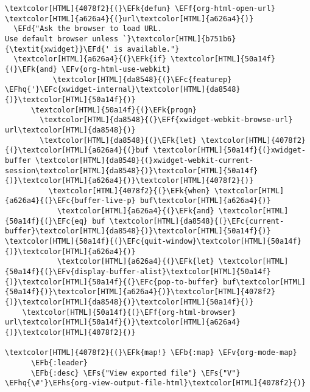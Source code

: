 \documentclass{scrartcl}
\newcommand{\EFk}[1]{\textcolor{EFk}{#1}} %
\newcommand{\EFd}[1]{\textcolor{EFd}{\textit{#1}}} %
\newcommand{\EFs}[1]{\textcolor{EFs}{#1}} %
\newcommand{\EFb}[1]{\textcolor{EFb}{#1}} %
\newcommand{\EFc}[1]{\textcolor{EFc}{#1}} %
\newcommand{\EFv}[1]{\textcolor{EFv}{#1}} %
\newcommand{\EFf}[1]{\textcolor{EFf}{#1}} %
\newcommand{\EFhq}[1]{\textcolor{EFhq}{#1}} %
\newcommand{\EFhs}[1]{\textcolor{EFhs}{#1}} %
\begin{document}
\begin{Code}
\begin{Verbatim}[]
\textcolor[HTML]{4078f2}{(}\EFk{defun} \EFf{org-html-open-url} \textcolor[HTML]{a626a4}{(}url\textcolor[HTML]{a626a4}{)}
  \EFd{"Ask the browser to load URL.
Use default browser unless `}\textcolor[HTML]{b751b6}{\textit{xwidget}}\EFd{' is available."}
  \textcolor[HTML]{a626a4}{(}\EFk{if} \textcolor[HTML]{50a14f}{(}\EFk{and} \EFv{org-html-use-webkit}
           \textcolor[HTML]{da8548}{(}\EFc{featurep} \EFhq{'}\EFc{xwidget-internal}\textcolor[HTML]{da8548}{)}\textcolor[HTML]{50a14f}{)}
      \textcolor[HTML]{50a14f}{(}\EFk{progn}
        \textcolor[HTML]{da8548}{(}\EFf{xwidget-webkit-browse-url} url\textcolor[HTML]{da8548}{)}
        \textcolor[HTML]{da8548}{(}\EFk{let} \textcolor[HTML]{4078f2}{(}\textcolor[HTML]{a626a4}{(}buf \textcolor[HTML]{50a14f}{(}xwidget-buffer \textcolor[HTML]{da8548}{(}xwidget-webkit-current-session\textcolor[HTML]{da8548}{)}\textcolor[HTML]{50a14f}{)}\textcolor[HTML]{a626a4}{)}\textcolor[HTML]{4078f2}{)}
          \textcolor[HTML]{4078f2}{(}\EFk{when} \textcolor[HTML]{a626a4}{(}\EFc{buffer-live-p} buf\textcolor[HTML]{a626a4}{)}
            \textcolor[HTML]{a626a4}{(}\EFk{and} \textcolor[HTML]{50a14f}{(}\EFc{eq} buf \textcolor[HTML]{da8548}{(}\EFc{current-buffer}\textcolor[HTML]{da8548}{)}\textcolor[HTML]{50a14f}{)} \textcolor[HTML]{50a14f}{(}\EFc{quit-window}\textcolor[HTML]{50a14f}{)}\textcolor[HTML]{a626a4}{)}
            \textcolor[HTML]{a626a4}{(}\EFk{let} \textcolor[HTML]{50a14f}{(}\EFv{display-buffer-alist}\textcolor[HTML]{50a14f}{)}\textcolor[HTML]{50a14f}{(}\EFc{pop-to-buffer} buf\textcolor[HTML]{50a14f}{)}\textcolor[HTML]{a626a4}{)}\textcolor[HTML]{4078f2}{)}\textcolor[HTML]{da8548}{)}\textcolor[HTML]{50a14f}{)}
    \textcolor[HTML]{50a14f}{(}\EFf{org-html-browser} url\textcolor[HTML]{50a14f}{)}\textcolor[HTML]{a626a4}{)}\textcolor[HTML]{4078f2}{)}

\textcolor[HTML]{4078f2}{(}\EFk{map!} \EFb{:map} \EFv{org-mode-map}
      \EFb{:leader}
      \EFb{:desc} \EFs{"View exported file"} \EFs{"V"} \EFhq{\#'}\EFhs{org-view-output-file-html}\textcolor[HTML]{4078f2}{)}


\end{Verbatim}
\end{Code}
\end{document}
